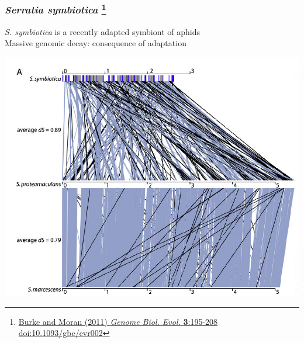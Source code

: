 \begin{frame}
  \frametitle{\textit{Serratia symbiotica} 
  \footnote{\tiny{\href{http://dx.doi.org/10.1093/gbe/evr002}{Burke and Moran (2011) \textit{Genome Biol. Evol.} \textbf{3}:195-208 doi:10.1093/gbe/evr002}}}
  }
  \textit{S. symbiotica} is a recently adapted symbiont of aphids\\
  \textcolor{hutton_green}{Massive genomic decay: consequence of adaptation}\\
  \begin{center}
    \includegraphics[width=0.75\textheight]{images/s_symbiotica}
  \end{center}    
\end{frame}



